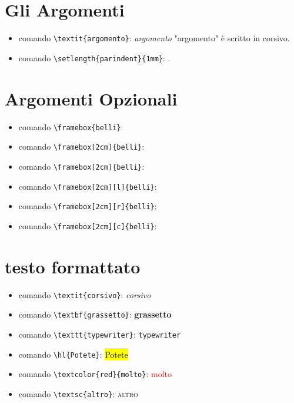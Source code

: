 \documentclass{article}
\begin{document}
        \section{Gli Argomenti}
            \begin{itemize}
                \item comando \verb!\textit{argomento}!: \textit{argomento} "argomento" è scritto in corsivo.
                \item comando \verb!\setlength{parindent}{1mm}!: \setlength{parindent}{1mm}.
            \end{itemize}   
        
        \section{Argomenti Opzionali}
            \begin{itemize}
                \item comando \verb!\framebox{belli}!: 
                \item comando \verb!\framebox[2cm]{belli}!:  
                \item comando \verb!\framebox[2cm]{belli}!:   
                \item comando \verb!\framebox[2cm][l]{belli}!:    
                \item comando \verb!\framebox[2cm][r]{belli}!:    
                \item comando \verb!\framebox[2cm][c]{belli}!: 
            \end{itemize}   

        \section{testo formattato}
            \begin{itemize}
                \item comando \verb!\textit{corsivo}!: \textit{corsivo}
                \item comando \verb!\textbf{grassetto}!: \textbf{grassetto}
                \item comando \verb!\texttt{typewriter}!: \texttt{typewriter}
                \item comando \verb!\hl{Potete}!: \hl{Potete}
                \item comando \verb!\textcolor{red}{molto}!: \textcolor{red}{molto}
                \item comando \verb!\textsc{altro}!: \textsc{altro}
            \end{itemize}
\end{document}
